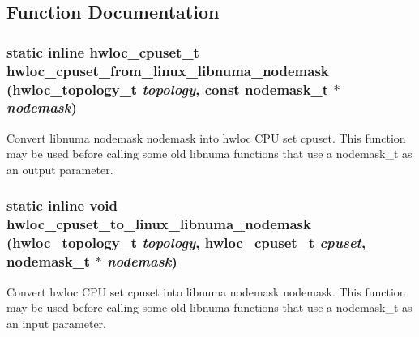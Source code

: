 \subsection{Function Documentation}
\hypertarget{group__hwlocality__linux__libnuma__nodemask_gac199bbdcd7913ce17bd36a168e00991f}{
\subsubsection[{hwloc\_\-cpuset\_\-from\_\-linux\_\-libnuma\_\-nodemask}]{\setlength{\rightskip}{0pt plus 5cm}static inline {\bf hwloc\_\-cpuset\_\-t} hwloc\_\-cpuset\_\-from\_\-linux\_\-libnuma\_\-nodemask ({\bf hwloc\_\-topology\_\-t} {\em topology}, \/  const nodemask\_\-t $\ast$ {\em nodemask})}}
\label{group__hwlocality__linux__libnuma__nodemask_gac199bbdcd7913ce17bd36a168e00991f}


Convert libnuma nodemask {\ttfamily nodemask} into hwloc CPU set {\ttfamily cpuset}. This function may be used before calling some old libnuma functions that use a nodemask\_\-t as an output parameter. \hypertarget{group__hwlocality__linux__libnuma__nodemask_gad6c037010e89674b799ed8131d7a632c}{
\subsubsection[{hwloc\_\-cpuset\_\-to\_\-linux\_\-libnuma\_\-nodemask}]{\setlength{\rightskip}{0pt plus 5cm}static inline void hwloc\_\-cpuset\_\-to\_\-linux\_\-libnuma\_\-nodemask ({\bf hwloc\_\-topology\_\-t} {\em topology}, \/  {\bf hwloc\_\-cpuset\_\-t} {\em cpuset}, \/  nodemask\_\-t $\ast$ {\em nodemask})}}
\label{group__hwlocality__linux__libnuma__nodemask_gad6c037010e89674b799ed8131d7a632c}


Convert hwloc CPU set {\ttfamily cpuset} into libnuma nodemask {\ttfamily nodemask}. This function may be used before calling some old libnuma functions that use a nodemask\_\-t as an input parameter. 
